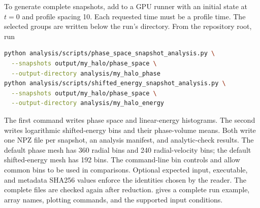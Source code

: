 To generate complete snapshots, add
 to a GPU runner with an
initial state at $t=0$ and profile spacing 10. Each requested time must be
a profile time. The selected groups are written below the run's
 directory. From the repository root, run
\begin{lstlisting}[language=bash]
python analysis/scripts/phase_space_snapshot_analysis.py \
  --snapshots output/my_halo/phase_space \
  --output-directory analysis/my_halo_phase
python analysis/scripts/shifted_energy_snapshot_analysis.py \
  --snapshots output/my_halo/phase_space \
  --output-directory analysis/my_halo_energy
\end{lstlisting}
The first command writes phase space and linear-energy histograms. The
second writes logarithmic shifted-energy bins and their phase-volume
means. Both write one NPZ file per snapshot, an analysis manifest, and
analytic-check results. The default phase mesh has 360 radial bins and
240 radial-velocity bins; the default shifted-energy mesh has 192 bins.
The command-line bin controls and 
allow common bins to be used in comparisons. Optional expected input,
executable, and metadata SHA256 values enforce the identities chosen by
the reader. The complete files are checked again after reduction.
\code{analysis/README.md} gives a complete run example, array names, plotting
commands, and the supported input conditions.
